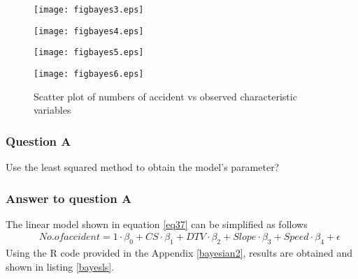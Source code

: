 \begin{figure}
 \begin{minipage}[h]{0.5\linewidth}
        \centering
        \texttt{[image: figbayes3.eps]}
				\label{figbayes3}
     \end{minipage}
\vspace{3.00mm}
    \begin{minipage}[h]{0.5\linewidth}
       \centering
       \texttt{[image: figbayes4.eps]}
			\label{figbayes4}
     \end{minipage}
\vspace{3.00mm} 
    \begin{minipage}[h]{0.5\linewidth}
        \centering
        \texttt{[image: figbayes5.eps]}
				\label{figbayes5}
     \end{minipage}
\vspace{3.00mm}
    \begin{minipage}[h]{0.5\linewidth}
       \centering
       \texttt{[image: figbayes6.eps]}
			\label{figbayes6}
     \end{minipage}
\caption{Scatter plot of numbers of accident vs observed characteristic variables}
\label{figbayesx}
\end{figure}

\subsubsection{Question A}
Use the least squared method to obtain the model's parameter?
\subsubsection{Answer to question A}
The linear model shown in equation \eqref{eq37} can be simplified as follows
\begin{eqnarray}
 && No. of accident = 1\cdot \beta_0 + CS \cdot \beta_1 + DTV\cdot \beta_2 + Slope \cdot \beta_3 + Speed \cdot \beta_4 + \epsilon\label{bayes24}
\end{eqnarray}
Using the R code provided in the Appendix \ref{bayesian2}, results are obtained and shown in listing \ref{bayesls}.



